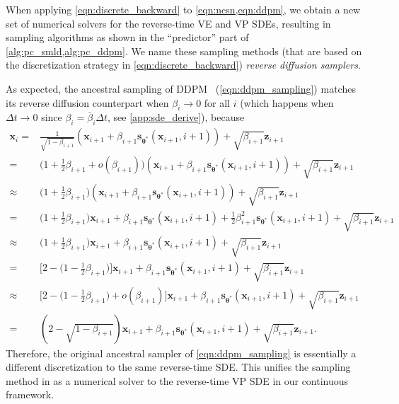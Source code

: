 \documentclass{article} %
\newcommand{\bfx}{\mathbf{x}}
\newcommand{\bfz}{\mathbf{z}}
\newcommand{\bftheta}{{\boldsymbol{\theta}}}
\newcommand{\bfs}{\mathbf{s}}
\newcommand{\bbeta}{\bar{\beta}}
\begin{document}
When applying \cref{eqn:discrete_backward} to \cref{eqn:ncsn,eqn:ddpm}, we obtain a new set of numerical solvers for the reverse-time VE and VP SDEs, resulting in sampling algorithms as shown in the ``predictor'' part of \cref{alg:pc_smld,alg:pc_ddpm}. We name these sampling methods (that are based on the discretization strategy in \cref{eqn:discrete_backward}) \emph{reverse diffusion samplers}. 

As expected, the ancestral sampling of DDPM~\citep{ho2020denoising} (\cref{eqn:ddpm_sampling}) matches its reverse diffusion counterpart when $\beta_i \to 0$ for all $i$ (which happens when $\Delta t \to 0$ since $\beta_i = \bbeta_i \Delta t$, see \cref{app:sde_derive}), because
\begin{align*}
    \bfx_i = &\frac{1}{\sqrt{1-\beta_{i+1}}}(\bfx_{i+1} + \beta_{i+1} \bfs_{\bftheta^*}(\bfx_{i+1}, i+1)) + \sqrt{\beta_{i+1}} \bfz_{i+1}\\
    =&  \bigg( 1 + \frac{1}{2}\beta_{i+1} + o(\beta_{i+1}) \bigg)(\bfx_{i+1} + \beta_{i+1} \bfs_{\bftheta^*}(\bfx_{i+1}, i+1)) + \sqrt{\beta_{i+1}} \bfz_{i+1}\\
    \approx & \bigg( 1 + \frac{1}{2}\beta_{i+1} \bigg)(\bfx_{i+1} + \beta_{i+1} \bfs_{\bftheta^*}(\bfx_{i+1}, i+1)) + \sqrt{\beta_{i+1}} \bfz_{i+1}\\
    =&\bigg(1 + \frac{1}{2}\beta_{i+1} \bigg) \bfx_{i+1} + \beta_{i+1}\bfs_{\bftheta^*}(\bfx_{i+1}, i+1) + \frac{1}{2}\beta_{i+1}^2 \bfs_{\bftheta^*}(\bfx_{i+1}, i+1) + \sqrt{\beta_{i+1}} \bfz_{i+1}\\
    \approx& \bigg(1 + \frac{1}{2}\beta_{i+1} \bigg) \bfx_{i+1} + \beta_{i+1}\bfs_{\bftheta^*}(\bfx_{i+1}, i+1) + \sqrt{\beta_{i+1}} \bfz_{i+1}\\
    =& \bigg[2 - \bigg(1 - \frac{1}{2}\beta_{i+1}\bigg) \bigg] \bfx_{i+1} + \beta_{i+1}\bfs_{\bftheta^*}(\bfx_{i+1}, i+1) + \sqrt{\beta_{i+1}} \bfz_{i+1}\\
    \approx& \bigg[2 - \bigg(1 - \frac{1}{2}\beta_{i+1}\bigg) + o(\beta_{i+1}) \bigg] \bfx_{i+1} + \beta_{i+1}\bfs_{\bftheta^*}(\bfx_{i+1}, i+1) + \sqrt{\beta_{i+1}} \bfz_{i+1}\\
    =& (2 - \sqrt{1-\beta_{i+1}})\bfx_{i+1} + \beta_{i+1}\bfs_{\bftheta^*}(\bfx_{i+1}, i+1)+ \sqrt{\beta_{i+1}} \bfz_{i+1}.
\end{align*}
Therefore, the original ancestral sampler of \cref{eqn:ddpm_sampling} is essentially a different discretization to the same reverse-time SDE. This unifies the sampling method in \citet{ho2020denoising} as a numerical solver to the reverse-time VP SDE in our continuous framework. %
\end{document}
